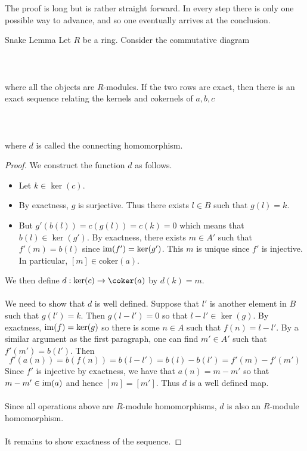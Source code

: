 \documentclass[a4paper]{article}
\begin{document}
The proof is long but is rather straight forward. In every step there is only one possible way to advance, and so one eventually arrives at the conclusion. 

\begin{lmm}{Snake Lemma}{} Let $R$ be a ring. Consider the commutative diagram \\~\\
\\~\\
where all the objects are $R$-modules. If the two rows are exact, then there is an exact sequence relating the kernels and cokernels of $a,b,c$ \\~\\
\\~\\
where $d$ is called the connecting homomorphism. 
\begin{proof}
We construct the function $d$ as follows. 
\begin{itemize}
\item Let $k\in\ker(c)$. 
\item By exactness, $g$ is surjective. Thus there exists $l\in B$ such that $g(l)=k$. 
\item But $g'(b(l))=c(g(l))=c(k)=0$ which means that $b(l)\in\ker(g')$. By exactness, there exists $m\in A'$ such that $f'(m)=b(l)$ since $\operatorname{im}(f')=\ker(g')$. This $m$ is unique since $f'$ is injective. In particular, $[m]\in\text{coker}(a)$. 
\end{itemize}
We then define $d:\ker(c)\to\coker(a)$ by $d(k)=m$. \\~\\

We need to show that $d$ is well defined. Suppose that $l'$ is another element in $B$ such that $g(l')=k$. Then $g(l-l')=0$ so that $l-l'\in\ker(g)$. By exactness, $\operatorname{im}(f)=\ker(g)$ so there is some $n\in A$ such that $f(n)=l-l'$. By a similar argument as the first paragraph, one can find $m'\in A'$ such that $f'(m')=b(l')$. Then $$f'(a(n))=b(f(n))=b(l-l')=b(l)-b(l')=f'(m)-f'(m')$$ Since $f'$ is injective by exactness, we have that $a(n)=m-m'$ so that $m-m'\in\operatorname{im}(a)$ and hence $[m]=[m']$. Thus $d$ is a well defined map. \\~\\

Since all operations above are $R$-module homomorphisms, $d$ is also an $R$-module homomorphism. \\~\\

It remains to show exactness of the sequence. 
\end{proof}
\end{lmm}
\end{document}
